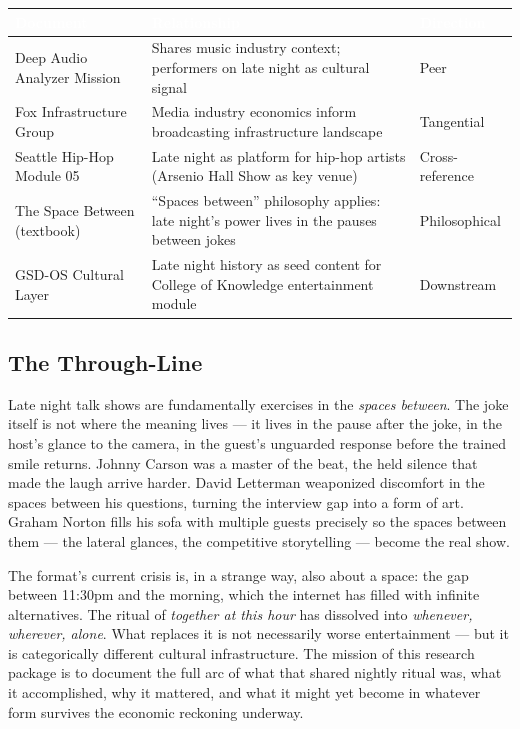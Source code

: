 \documentclass[11pt,letterpaper]{article}
\newcommand{\tableheader}[1]{\textbf{\sffamily\textcolor{white}{#1}}}
\begin{document}
\begin{center}
\begin{tabularx}{\textwidth}{L{4cm}XC{2.5cm}}
\toprule
{}
\tableheader{Document} & \tableheader{Relationship} & \tableheader{Direction} \\
\midrule
Deep Audio Analyzer Mission & Shares music industry context; performers on late night as cultural signal & Peer \\
Fox Infrastructure Group & Media industry economics inform broadcasting infrastructure landscape & Tangential \\
Seattle Hip-Hop Module 05 & Late night as platform for hip-hop artists (Arsenio Hall Show as key venue) & Cross-reference \\
The Space Between (textbook) & ``Spaces between'' philosophy applies: late night's power lives in the pauses between jokes & Philosophical \\
GSD-OS Cultural Layer & Late night history as seed content for College of Knowledge entertainment module & Downstream \\
\bottomrule
\end{tabularx}
\end{center}

\subsection{The Through-Line}

Late night talk shows are fundamentally exercises in the \textit{spaces between}. The joke itself is not where the meaning lives --- it lives in the pause after the joke, in the host's glance to the camera, in the guest's unguarded response before the trained smile returns. Johnny Carson was a master of the beat, the held silence that made the laugh arrive harder. David Letterman weaponized discomfort in the spaces between his questions, turning the interview gap into a form of art. Graham Norton fills his sofa with multiple guests precisely so the spaces between them --- the lateral glances, the competitive storytelling --- become the real show.

The format's current crisis is, in a strange way, also about a space: the gap between 11:30pm and the morning, which the internet has filled with infinite alternatives. The ritual of \textit{together at this hour} has dissolved into \textit{whenever, wherever, alone}. What replaces it is not necessarily worse entertainment --- but it is categorically different cultural infrastructure. The mission of this research package is to document the full arc of what that shared nightly ritual was, what it accomplished, why it mattered, and what it might yet become in whatever form survives the economic reckoning underway.
\end{document}
